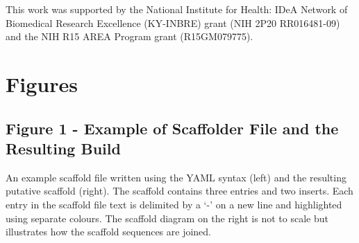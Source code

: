 \documentclass[10pt]{bmc_article}
\newenvironment{bmcformat}{\begin{raggedright}\baselineskip20pt\sloppy\setboolean{publ}{false}}{\end{raggedright}\baselineskip20pt\sloppy}
\begin{document}
\begin{bmcformat}
This work was supported by the National Institute for Health: IDeA Network of
Biomedical Research Excellence (KY-INBRE) grant (NIH 2P20 RR016481-09) and the
NIH R15 AREA Program grant (R15GM079775).

\clearpage

{
   }     %


\clearpage

\section*{Figures} %

\subsection*{Figure 1 - Example of Scaffolder File and the Resulting Build}

An example scaffold file written using the YAML syntax \cite{yaml} (left) and
the resulting putative scaffold (right). The scaffold contains three entries
and two inserts. Each entry in the scaffold file text is delimited by a `-' on
a new line and highlighted using separate colours. The scaffold diagram on the
right is not to scale but illustrates how the scaffold sequences are joined.
\pb

\end{bmcformat}
\end{document}
